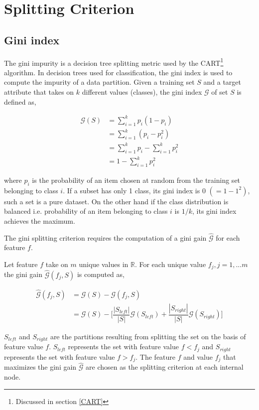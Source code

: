 \documentclass[a4paper,twoside]{report}
\begin{document}
\chapter{Splitting Criterion}
\label{split}
\section{Gini index}
The gini impurity is a decision tree splitting metric used by the CART\footnote{Discussed in section \ref{CART}} algorithm. In decision trees used for classification, the gini index is used to compute the impurity of a data partition. Given a training set $S$ and a target attribute that takes on $k$ different values (classes), the gini index $\mathcal{G}$ of set $S$ is defined as,
   
\begin{align*}
\mathcal{G}(S) &= \sum_{i=1}^{k} p_{i}(1 - p_{i})  \\
&= \sum_{i=1}^k(p_{i} - p_{i}^2) \\
&= \sum_{i=1}^k p_{i} - \sum_{i=1}^k p_{i}^2 \\
 &= 1 - \sum_{i=1}^k p_{i}^{2}  
\end{align*}

where $p_{i}$ is the probability of an item chosen at random from the training set belonging to class $i$. If a subset has only 1 class, its gini index is $0$ $(=1 - 1^{2})$, such a set is a pure dataset. On the other hand if the class distribution is balanced i.e. probability of an item belonging to class $i$ is $1/k$, its gini index achieves the maximum.

The gini splitting criterion requires the computation of a gini gain $\hat{\mathcal{G}}$ for each feature $f$. 

Let feature $f$ take on $m$ unique values in $\mathbb{R}$. For each unique value $f_{j}, j = 1,...m$ the gini gain $\hat{\mathcal{G}}(f_{j},S)$ is computed as, 

\begin{align*}
\hat{\mathcal{G}}(f_{j},S) &= \mathcal{G}(S) - \mathcal{G}(f_{j},S)  \\
&= \mathcal{G}(S) - \Bigg[ \dfrac{|S_{left}|}{|S|} \mathcal{G}(S_{left}) + \dfrac{|S_{right}|}{|S|} \mathcal{G}(S_{right}) \Bigg]
\end{align*}
 
$S_{left}$ and $S_{right}$ are the partitions resulting from splitting the set on the basis of feature value $f$. $S_{left}$ represents the set with feature value $f < f_{j}$ and $S_{right}$ represents the set with feature value $f > f_{j}$. The feature $f$ and value $f_{j}$ that maximizes the gini gain $\hat{\mathcal{G}}$ are chosen as the splitting criterion at each internal node.
\end{document}
